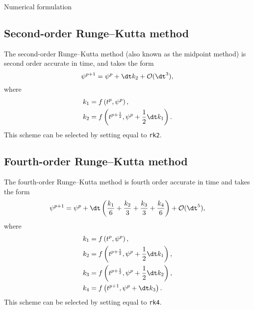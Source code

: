 \begin{chapter}{\label{cha:numerics}Numerical formulation}
  \subsection{Second-order Runge--Kutta method}
  The second-order Runge--Kutta method (also known as the midpoint method) is
  second order accurate in time, and takes the form
  \begin{equation*}
    \psi^{p+1} = \psi^{p} + \dt k_{2} + \mathcal{O}(\dt^{3}),
  \end{equation*}
  where
  \begin{equation*}
    \begin{aligned}
      k_{1} &= f\left( t^{p}, \psi^{p} \right), \\
      k_{2} &= f\left( t^{p+\frac{1}{2}}, \psi^{p} + \frac{1}{2}\dt k_{1}
      \right).
    \end{aligned}
  \end{equation*}
  This scheme can be selected by setting  equal to \verb"rk2".

  \subsection{Fourth-order Runge--Kutta method}
  The fourth-order Runge--Kutta method is fourth order accurate in time and
  takes the form
  \begin{equation*}
    \psi^{p+1} = \psi^{p} + \dt \left( \frac{k_{1}}{6} + \frac{k_{2}}{3} +
    \frac{k_{3}}{3} + \frac{k_{4}}{6} \right) + \mathcal{O}(\dt^{5}),
  \end{equation*}
  where
  \begin{equation*}
    \begin{aligned}
      k_{1} &= f\left( t^{p}, \psi^{p} \right), \\
      k_{2} &= f\left( t^{p+\frac{1}{2}}, \psi^{p} + \frac{1}{2}\dt k_{1}
      \right), \\
      k_{3} &= f\left( t^{p+\frac{1}{2}}, \psi^{p} + \frac{1}{2}\dt k_{2}
      \right), \\
      k_{4} &= f\left( t^{p+1}, \psi^{p} + \dt k_{3} \right).
    \end{aligned}
  \end{equation*}
  This scheme can be selected by setting  equal to \verb"rk4".


\end{chapter}
